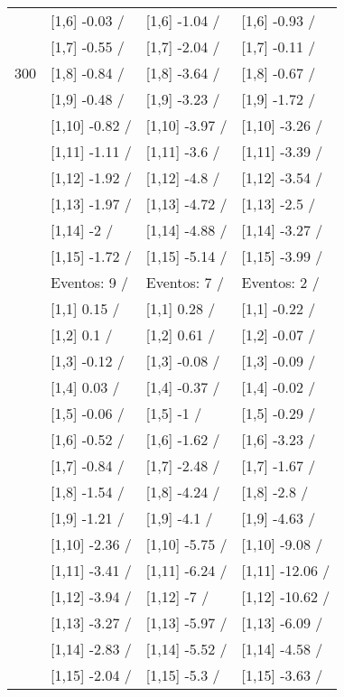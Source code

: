 \begin{table}
\begin{tabular}[t]{llll}
 & {}[1,6] -0.03  / & {}[1,6] -1.04  / & {}[1,6] -0.93  /\\
 & {}[1,7] -0.55  / & {}[1,7] -2.04  / & {}[1,7] -0.11  /\\
300 & {}[1,8] -0.84  / & {}[1,8] -3.64  / & {}[1,8] -0.67  /\\
\addlinespace
 & {}[1,9] -0.48  / & {}[1,9] -3.23  / & {}[1,9] -1.72  /\\
 & {}[1,10] -0.82  / & {}[1,10] -3.97  / & {}[1,10] -3.26  /\\
 & {}[1,11] -1.11  / & {}[1,11] -3.6  / & {}[1,11] -3.39  /\\
 & {}[1,12] -1.92  / & {}[1,12] -4.8  / & {}[1,12] -3.54  /\\
 & {}[1,13] -1.97  / & {}[1,13] -4.72  / & {}[1,13] -2.5  /\\
\addlinespace
 & {}[1,14] -2  / & {}[1,14] -4.88  / & {}[1,14] -3.27  /\\
 & {}[1,15] -1.72  / & {}[1,15] -5.14  / & {}[1,15] -3.99  /\\
 & Eventos:  9 / & Eventos:  7 / & Eventos:  2 /\\
 & {}[1,1] 0.15  / & {}[1,1] 0.28  / & {}[1,1] -0.22  /\\
 & {}[1,2] 0.1  / & {}[1,2] 0.61  / & {}[1,2] -0.07  /\\
\addlinespace
 & {}[1,3] -0.12  / & {}[1,3] -0.08  / & {}[1,3] -0.09  /\\
 & {}[1,4] 0.03  / & {}[1,4] -0.37  / & {}[1,4] -0.02  /\\
 & {}[1,5] -0.06  / & {}[1,5] -1  / & {}[1,5] -0.29  /\\
 & {}[1,6] -0.52  / & {}[1,6] -1.62  / & {}[1,6] -3.23  /\\
 & {}[1,7] -0.84  / & {}[1,7] -2.48  / & {}[1,7] -1.67  /\\
\addlinespace
500 & {}[1,8] -1.54  / & {}[1,8] -4.24  / & {}[1,8] -2.8  /\\
 & {}[1,9] -1.21  / & {}[1,9] -4.1  / & {}[1,9] -4.63  /\\
 & {}[1,10] -2.36  / & {}[1,10] -5.75  / & {}[1,10] -9.08  /\\
 & {}[1,11] -3.41  / & {}[1,11] -6.24  / & {}[1,11] -12.06  /\\
 & {}[1,12] -3.94  / & {}[1,12] -7  / & {}[1,12] -10.62  /\\
\addlinespace
 & {}[1,13] -3.27  / & {}[1,13] -5.97  / & {}[1,13] -6.09  /\\
 & {}[1,14] -2.83  / & {}[1,14] -5.52  / & {}[1,14] -4.58  /\\
 & {}[1,15] -2.04  / & {}[1,15] -5.3  / & {}[1,15] -3.63  /\\
\bottomrule
\end{tabular}
\end{table}
